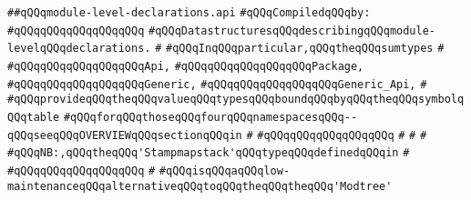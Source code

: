 \label{src/lib/compiler/front/typer-stuff/modules/module-level-declarations.api}
\verb|##qQQqmodule-level-declarations.api|\newline
\newline
\verb|#qQQqCompiledqQQqby:|\newline
\verb|#qQQqqQQqqQQqqQQqqQQq|\newline
\newline
\newline
\newline
\verb|#qQQqDatastructuresqQQqdescribingqQQqmodule-levelqQQqdeclarations.|\newline
\verb|#|\newline
\verb|#qQQqInqQQqparticular,qQQqtheqQQqsumtypes|\newline
\verb|#|\newline
\verb|#qQQqqQQqqQQqqQQqqQQqApi,|\newline
\verb|#qQQqqQQqqQQqqQQqqQQqPackage,|\newline
\verb|#qQQqqQQqqQQqqQQqqQQqGeneric,|\newline
\verb|#qQQqqQQqqQQqqQQqqQQqGeneric_Api,|\newline
\verb|#|\newline
\verb|#qQQqprovideqQQqtheqQQqvalueqQQqtypesqQQqboundqQQqbyqQQqtheqQQqsymbolqQQqtable|\newline
\verb|#qQQqforqQQqthoseqQQqfourqQQqnamespacesqQQq--qQQqseeqQQqOVERVIEWqQQqsectionqQQqin|\newline
\verb|#|\newline
\verb|#qQQqqQQqqQQqqQQqqQQq|\newline
\verb|#|\newline
\verb|#|\newline
\verb|#|\newline
\verb|#qQQqNB:,qQQqtheqQQq'Stampmapstack'qQQqtypeqQQqdefinedqQQqin|\newline
\verb|#|\newline
\verb|#qQQqqQQqqQQqqQQqqQQq|\newline
\verb|#|\newline
\verb|#qQQqisqQQqaqQQqlow-maintenanceqQQqalternativeqQQqtoqQQqtheqQQqtheqQQq'Modtree'|\newline
